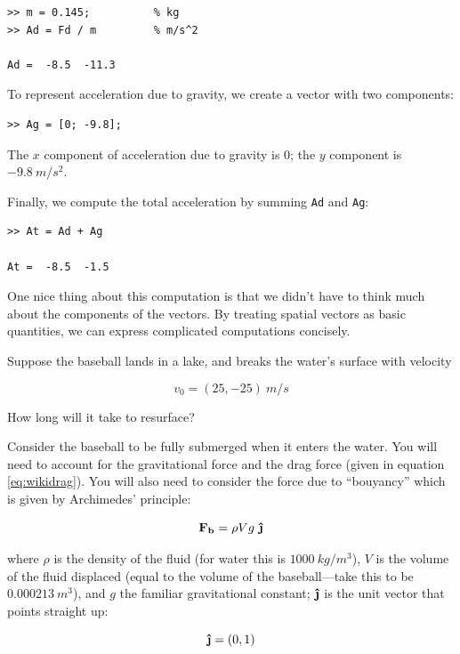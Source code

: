 \documentclass[
]{book}
\renewcommand{\vec}[1]{\bm{\mathbf{#1}}}
\newcommand{\uveci}{{\bm{\hat{\textnormal{\bfseries\i}}}}}
\newcommand{\uvecj}{{\bm{\hat{\textnormal{\bfseries\j}}}}}
\newcommand{\uvec}[1]{%
    \ifthenelse{\equal{#1}{i}}%
        {\uveci}{%
    \ifthenelse{\equal{#1}{j}}%
        {\uvecj}{%
    {\bm{\hat{\mathbf{#1}}}}%
}}}
\begin{document}
\begin{verbatim}
>> m = 0.145;          % kg
>> Ad = Fd / m         % m/s^2

Ad =  -8.5  -11.3
\end{verbatim}

To represent acceleration due to gravity, we create a vector
with two components:

\begin{verbatim}
>> Ag = [0; -9.8];
\end{verbatim}

The $x$ component of acceleration due to gravity is 0; the $y$ component is $-9.8 ~ m/s^2$.

Finally, we compute the total acceleration by summing {\tt Ad} and {\tt Ag}:

\begin{verbatim}
>> At = Ad + Ag

At =  -8.5  -1.5
\end{verbatim}

One nice thing about this computation is that we didn't have to think
much about the components of the vectors.  By treating spatial vectors
as basic quantities, we can express complicated computations concisely.

\begin{ex}
Suppose the baseball lands in a lake, and breaks the water's surface
    with velocity

\begin{equation}
    v_0 = (25, -25) ~  m/s
\end{equation}

How long will it take to resurface?

Consider the baseball to be fully
    submerged when it enters the water. You will need to account for the
    gravitational force and the drag force (given in equation
    \eqref{eq:wikidrag}). You will also need to consider the force due
    to ``bouyancy'' which is given by Archimedes' principle:

\begin{equation}
    \vec{F_b} = \rho V g ~ \uvec{j}
\end{equation}

where $\rho$ is the density of the fluid (for water this is $1000 ~ kg /
    m^3$), $V$ is the volume of the fluid displaced (equal to the volume
    of the baseball---take this to be $0.000213 ~ m^3$), and $g$ the
    familiar gravitational constant; $\uvec{j}$ is the unit vector that
    points straight up:

\begin{equation}
    \uvec{j} = (0, 1)
\end{equation}

\end{ex}
\end{document}
